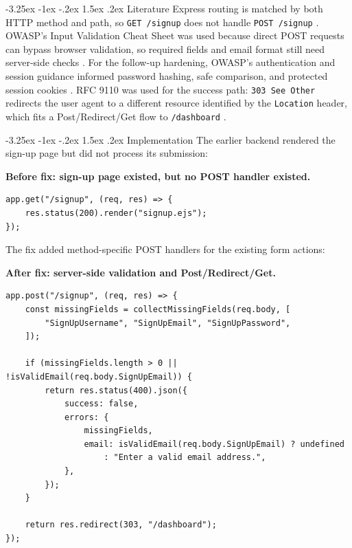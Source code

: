 \documentclass[12pt,a4paper]{article}
\makeatletter
\renewcommand\subsection{\@startsection{subsection}{2}{\z@}%
  {-3.25ex \@plus -1ex \@minus -.2ex}%
  {1.5ex \@plus .2ex}%
  {\normalfont\bfseries\fontsize{12}{14}\selectfont}}
\makeatother
\begin{document}
\subsection{Literature}
Express routing is matched by both HTTP method and path, so \texttt{GET /signup} does not handle \texttt{POST /signup} \cite{express-routing}. OWASP's Input Validation Cheat Sheet was used because direct POST requests can bypass browser validation, so required fields and email format still need server-side checks \cite{owasp-input-validation}. For the follow-up hardening, OWASP's authentication and session guidance informed password hashing, safe comparison, and protected session cookies \cite{owasp-authentication,owasp-session-management}. RFC 9110 was used for the success path: \texttt{303 See Other} redirects the user agent to a different resource identified by the \texttt{Location} header, which fits a Post/Redirect/Get flow to \texttt{/dashboard} \cite{rfc9110}.

\subsection{Implementation}
The earlier backend rendered the sign-up page but did not process its submission:

\noindent\textbf{Before fix: sign-up page existed, but no POST handler existed.}
{\footnotesize
\begin{verbatim}
app.get("/signup", (req, res) => {
    res.status(200).render("signup.ejs");
});
\end{verbatim}
}

The fix added method-specific POST handlers for the existing form actions:

\noindent\textbf{After fix: server-side validation and Post/Redirect/Get.}
{\footnotesize
\begin{verbatim}
app.post("/signup", (req, res) => {
    const missingFields = collectMissingFields(req.body, [
        "SignUpUsername", "SignUpEmail", "SignUpPassword",
    ]);

    if (missingFields.length > 0 || !isValidEmail(req.body.SignUpEmail)) {
        return res.status(400).json({
            success: false,
            errors: {
                missingFields,
                email: isValidEmail(req.body.SignUpEmail) ? undefined
                    : "Enter a valid email address.",
            },
        });
    }

    return res.redirect(303, "/dashboard");
});
\end{verbatim}
}
\end{document}
